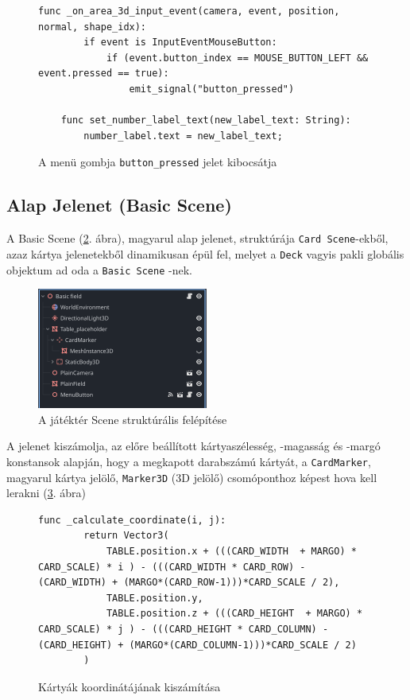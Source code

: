 \begin{figure}[H]
    \centering
    \begin{lstlisting}[language=GDScript]
    func _on_area_3d_input_event(camera, event, position, normal, shape_idx):
        if event is InputEventMouseButton:
            if (event.button_index == MOUSE_BUTTON_LEFT && event.pressed == true):
                emit_signal("button_pressed")
    
    func set_number_label_text(new_label_text: String):
        number_label.text = new_label_text;
    \end{lstlisting}
    \caption{A menü gombja  \lstinline{button_pressed} jelet kibocsátja}
    \label{code:button_pressed_signal}
\end{figure}

\subsection{Alap Jelenet (Basic Scene)}

A Basic Scene (\ref{img:basic_scene}. ábra), magyarul alap jelenet,  struktúrája \lstinline{Card Scene}-ekből, azaz kártya jelenetekből  dinamikusan épül fel, melyet a \lstinline|Deck| vagyis pakli globális objektum ad oda a \lstinline|Basic Scene| -nek. 
\begin{figure}[H]
    \centering
    \includegraphics[width=0.5\textwidth]{img/basic_field_scene_structure.png}
    \caption{A játéktér Scene struktúrális felépítése}
    \label{img:basic_scene}  
\end{figure}

A jelenet kiszámolja, az előre beállított kártyaszélesség, -magasság és -margó konstansok alapján, hogy a megkapott darabszámú kártyát, a \lstinline|CardMarker|, magyarul kártya jelölő, \lstinline|Marker3D| (3D jelölő) csomóponthoz \cite{Marker3D69:online} képest hova kell lerakni (\ref{code:calculate_coordinate}. ábra)
\begin{figure}[H]
    \centering
    \begin{lstlisting}[language=GDScript]
        func _calculate_coordinate(i, j):
        return Vector3(
            TABLE.position.x + (((CARD_WIDTH  + MARGO) * CARD_SCALE) * i ) - (((CARD_WIDTH * CARD_ROW) - (CARD_WIDTH) + (MARGO*(CARD_ROW-1)))*CARD_SCALE / 2),
            TABLE.position.y,
            TABLE.position.z + (((CARD_HEIGHT  + MARGO) * CARD_SCALE) * j ) - (((CARD_HEIGHT * CARD_COLUMN) - (CARD_HEIGHT) + (MARGO*(CARD_COLUMN-1)))*CARD_SCALE / 2)
        )
    \end{lstlisting}
    \caption{Kártyák koordinátájának kiszámítása}
    \label{code:calculate_coordinate}
\end{figure}

